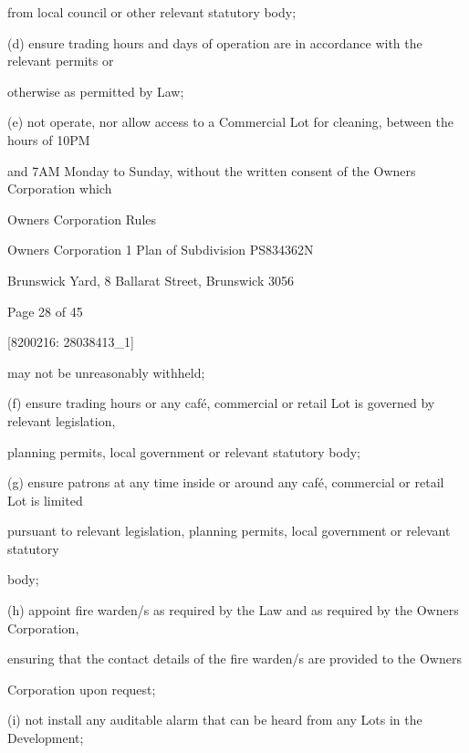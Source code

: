 \documentclass{article}
\begin{document}
{\fontsize{10.02}{1}from local council or other relevant statutory body; }

{\fontsize{9.962}{1}(d) ensure trading hours and days of operation are in accordance with the relevant permits or }

{\fontsize{10.02}{1}otherwise as permitted by Law; }

{\fontsize{9.962}{1}(e) not operate, nor allow access to a Commercial Lot for cleaning, between the hours of 10PM }

{\fontsize{10.02}{1}and 7AM Monday to Sunday, without the written consent of the Owners Corporation which }

\newpage





{\fontsize{9}{1}Owners Corporation Rules }

{\fontsize{9}{1}Owners Corporation 1 Plan of Subdivision PS834362N }

{\fontsize{9}{1}Brunswick Yard, 8 Ballarat Street, Brunswick 3056 }


{\fontsize{9}{1}Page 28  of 45 }



{\fontsize{7.02}{1}[8200216: 28038413\_1] }

{\fontsize{10.02}{1}may not be unreasonably withheld; }

{\fontsize{9.962}{1}(f) ensure trading hours or any café, commercial or retail Lot is governed by relevant legislation, }

{\fontsize{10.02}{1}planning permits, local government or relevant statutory body; }

{\fontsize{9.962}{1}(g) ensure patrons at any time inside or around any café, commercial or retail Lot is limited }

{\fontsize{10.02}{1}pursuant to relevant legislation, planning permits, local government or relevant statutory }

{\fontsize{10.02}{1}body; }

{\fontsize{9.962}{1}(h) appoint fire warden/s as required by the Law and as required by the Owners Corporation, }

{\fontsize{10.02}{1}ensuring that the contact details of the fire warden/s are provided to the Owners }

{\fontsize{10.02}{1}Corporation upon request; }

{\fontsize{9.962}{1}(i) not install any auditable alarm that can be heard from any Lots in the Development; }
\end{document}
